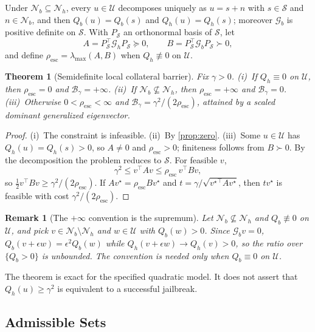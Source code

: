 \documentclass[11pt]{article}
\newtheorem{theorem}{Theorem}
\newtheorem{remark}{Remark}
\newcommand{\Gh}{\mathcal{G}_{h}}
\newcommand{\Gb}{\mathcal{G}_{b}}
\newcommand{\Resc}{\rho_{\mathrm{esc}}}
\newcommand{\Barrier}{\mathcal{B}}
\newcommand{\U}{\mathcal{U}}
\newcommand{\Nb}{\mathcal{N}_{b}}
\newcommand{\Nh}{\mathcal{N}_{h}}
\begin{document}
Under $\Nb\subseteq\Nh$, every $u\in\U$ decomposes uniquely as $u=s+n$ with $s\in\mathcal S$ and $n\in\Nb$, and then $Q_b(u)=Q_b(s)$ and $Q_h(u)=Q_h(s)$; moreover $\Gb$ is positive definite on $\mathcal S$. With $P_{\mathcal S}$ an orthonormal basis of $\mathcal S$, let
\begin{equation*}
A=P_{\mathcal S}^\top\Gh P_{\mathcal S}\succeq0,\qquad B=P_{\mathcal S}^\top\Gb P_{\mathcal S}\succ0,
\end{equation*}
and define $\Resc=\lambda_{\max}(A,B)$ when $Q_h\not\equiv0$ on $\U$.

\begin{theorem}[Semidefinite local collateral barrier]
\label{thm:barrier}
Fix $\gamma>0$.
(i)~If $Q_h\equiv0$ on $\U$, then $\Resc=0$ and $\Barrier_\gamma=+\infty$.
(ii)~If $\Nb\not\subseteq\Nh$, then $\Resc=+\infty$ and $\Barrier_\gamma=0$.
(iii)~Otherwise $0<\Resc<\infty$ and $\Barrier_\gamma=\gamma^2/(2\Resc)$, attained by a scaled dominant generalized eigenvector.
\end{theorem}
\begin{proof}
(i)~The constraint is infeasible. (ii)~By \cref{prop:zero}. (iii)~Some $u\in\U$ has $Q_h(u)=Q_h(s)>0$, so $A\ne0$ and $\Resc>0$; finiteness follows from $B\succ0$. By the decomposition the problem reduces to $\mathcal S$. For feasible $v$,
\begin{equation*}
\gamma^2\le v^\top Av\le\Resc\,v^\top Bv,
\end{equation*}
so $\tfrac12v^\top Bv\ge\gamma^2/(2\Resc)$. If $Av^\star=\Resc Bv^\star$ and $t=\gamma/\sqrt{{v^\star}^\top Av^\star}$, then $tv^\star$ is feasible with cost $\gamma^2/(2\Resc)$.
\end{proof}

\begin{remark}[The $+\infty$ convention is the supremum]
Let $\Nb\not\subseteq\Nh$ and $Q_b\not\equiv0$ on $\U$, and pick $v\in\Nb\setminus\Nh$ and $w\in\U$ with $Q_b(w)>0$. Since $\Gb v=0$, $Q_b(v+\epsilon w)=\epsilon^2Q_b(w)$ while $Q_h(v+\epsilon w)\to Q_h(v)>0$, so the ratio over $\{Q_b>0\}$ is unbounded. The convention is needed only when $Q_b\equiv0$ on $\U$.
\end{remark}

The theorem is exact for the specified quadratic model. It does not assert that $Q_h(u)\ge\gamma^2$ is equivalent to a successful jailbreak.

\subsection{Admissible Sets}
\label{app:admissible}
\end{document}
